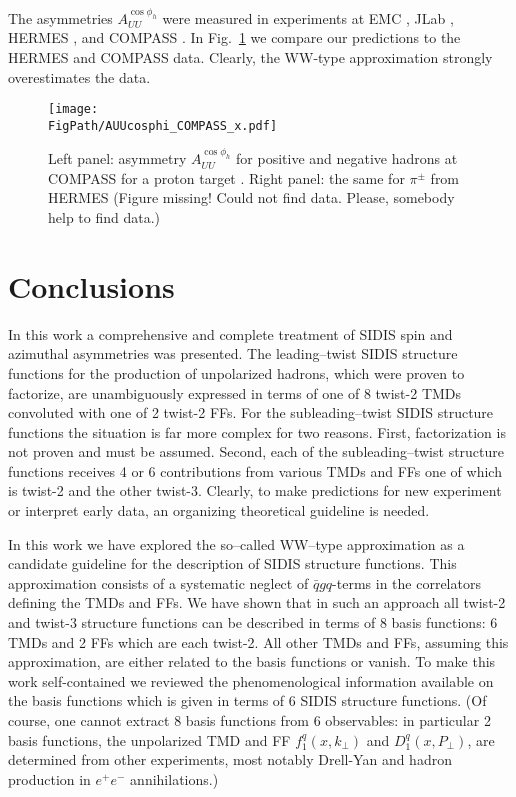 \documentclass[a4paper,11pt]{article}
\newcommand{\red}[1]{{\color{red} #1}}
\def\kperp{k_\perp}
\def\pperp{P_\perp}
\newcommand*{\FigPath}{./figs}%
\begin{document}
The asymmetries $A_{UU}^{\cos\phi_h}$ were measured in experiments at
EMC \cite{Aubert:1983cz}, JLab \cite{Osipenko:2008aa,Mkrtchyan:2007sr}, 
HERMES \cite{Airapetian:2012yg}, and COMPASS \cite{Adolph:2014pwc}.
In Fig.~\ref{auucosphi_jlab} we compare our predictions 
to the HERMES and COMPASS data. Clearly, the WW-type
approximation strongly overestimates the data.


\begin{figure}[ht]
\centering
\texttt{[image: \\FigPath/AUUcosphi\_COMPASS\_x.pdf]} 
\caption{\label{auucosphi_jlab} 
	Left panel: asymmetry $A_{UU}^{\cos\phi_h}$ for positive and negative 
	hadrons at COMPASS for a proton target \cite{Adolph:2014pwc}.
	Right panel: the same for $\pi^\pm$ from HERMES \cite{Airapetian:2012yg}
	\red{(Figure missing! Could not find data. Please, somebody
	help to find data.)}}
\end{figure}


{}

\newpage
\section{Conclusions}
\label{Sec-8:conclusions}

In this work a comprehensive and complete treatment of SIDIS
spin and azimuthal asymmetries was presented. The leading--twist
SIDIS structure functions for the production of unpolarized hadrons,
which were proven to factorize, are unambiguously expressed in terms 
of one of 8 twist-2 TMDs convoluted with one of 2 twist-2 FFs.
For the subleading--twist SIDIS structure functions the situation
is far more complex for two reasons. First, factorization is not 
proven and must be assumed. 
Second, each of the subleading--twist structure functions
receives 4 or 6 contributions from various TMDs and FFs one of
which is twist-2 and the other twist-3. Clearly, to make 
predictions for new experiment or interpret early data, an
organizing theoretical guideline is needed.

In this work we have explored the so--called WW--type approximation
as a candidate guideline for the description of SIDIS structure
functions. This approximation consists of a systematic neglect 
of $\bar qgq$-terms in the
correlators defining the TMDs and FFs. We have shown that in such
an approach all twist-2 and twist-3 structure functions can be
described in terms of 8 basis functions: 6 TMDs and 2 FFs
which are each twist-2. All other TMDs and FFs, assuming this
approximation, are either related to the basis functions or
vanish. To make this work self-contained
we reviewed the phenomenological information available
on the basis functions which is given in terms of 6 SIDIS
structure functions. (Of course, one cannot extract 8 basis
functions from 6 observables: in particular 2 basis functions,
the unpolarized TMD and FF $f_1^q(x,\kperp)$ and $D_1^q(x,\pperp)$,
are determined from other experiments, most notably Drell-Yan
and hadron production in $e^+e^-$ annihilations.)
\end{document}
